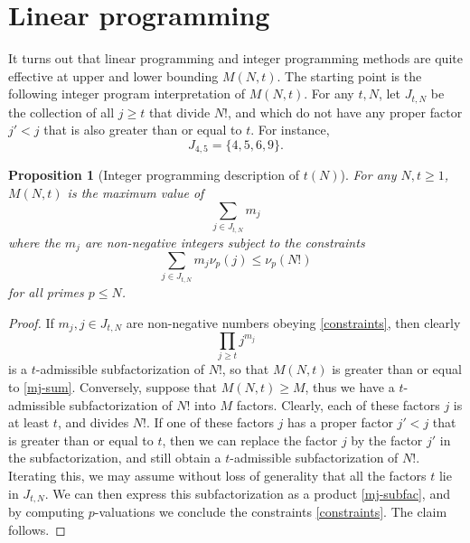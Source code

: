 \documentclass[12pt,a4paper,reqno]{amsart}
\numberwithin{equation}{section}
\theoremstyle{plain}
\newtheorem{proposition}[theorem]{Proposition}
\theoremstyle{definition}
\begin{document}
\section{Linear programming}\label{linprog-sec}

It turns out that linear programming and integer programming methods are quite effective at upper and lower bounding $M(N,t)$.  The starting point is the following integer program interpretation of $M(N,t)$. For any $t,N$, let $J_{t,N}$ be the collection of all $j \geq t$ that divide $N!$, and which do not have any proper factor $j' < j$ that is also greater than or equal to $t$.  For instance,
$$ J_{4,5} = \{ 4, 5, 6, 9 \}.$$ 

\begin{proposition}[Integer programming description of $t(N)$]\label{fip}  For any $N,t \geq 1$, $M(N,t)$ is the maximum value of
\begin{equation}\label{mj-sum}
   \sum_{j \in J_{t,N}} m_j
\end{equation}
where the $m_j$ are non-negative integers subject to the constraints
\begin{equation}\label{constraints}
  \sum_{j \in J_{t,N}} m_j \nu_p(j) \leq \nu_p(N!)
\end{equation}
for all primes $p \leq N$.
\end{proposition}

\begin{proof}  If $m_j, j \in J_{t,N}$ are non-negative numbers obeying \eqref{constraints}, then clearly
  \begin{equation}\label{mj-subfac} 
    \prod_{j \geq t} j^{m_j}
  \end{equation}
is a $t$-admissible subfactorization of $N!$, so that $M(N,t)$ is greater than or equal to \eqref{mj-sum}. Conversely, suppose that $M(N,t) \geq M$, thus we have a $t$-admissible subfactorization of $N!$ into $M$ factors.  Clearly, each of these factors $j$ is at least $t$, and divides $N!$.
If one of these factors $j$ has a proper factor $j' < j$ that is greater than or equal to $t$, then we can replace the factor $j$ by the factor $j'$ in the subfactorization, and still obtain a $t$-admissible subfactorization of $N!$.  Iterating this, we may assume without loss of generality that all the factors $t$ lie in $J_{t,N}$.  We can then express this subfactorization as a product \eqref{mj-subfac}, and by computing $p$-valuations we conclude the constraints \eqref{constraints}.  The claim follows.
\end{proof}
\end{document}
